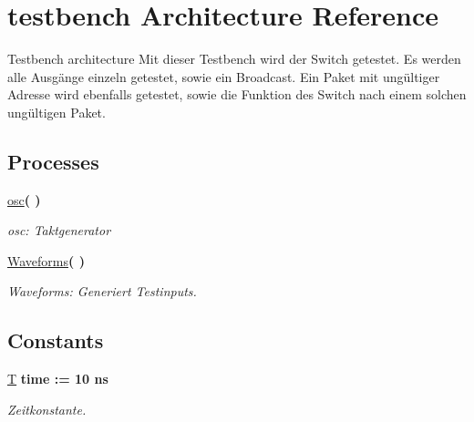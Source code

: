 \hypertarget{classtestbench_1_1testbench}{}\section{testbench Architecture Reference}
\label{classtestbench_1_1testbench}


Testbench architecture Mit dieser Testbench wird der Switch getestet. Es werden alle Ausgänge einzeln getestet, sowie ein Broadcast. Ein Paket mit ungültiger Adresse wird ebenfalls getestet, sowie die Funktion des Switch nach einem solchen ungültigen Paket.  


\subsection*{Processes}
 \begin{DoxyCompactItemize}
\item 
\mbox{\label{classtestbench_1_1testbench_a5e2335f6f6f0aa05413a0546a550ba71}} 
\mbox{\hyperlink{classtestbench_1_1testbench_a5e2335f6f6f0aa05413a0546a550ba71}{osc}}{\bfseries  (  )}
\begin{DoxyCompactList}\small\item\em osc\+: Taktgenerator \end{DoxyCompactList}\item 
\mbox{\label{classtestbench_1_1testbench_a77eeaf075b0fe111c4550ccc6850feb4}} 
\mbox{\hyperlink{classtestbench_1_1testbench_a77eeaf075b0fe111c4550ccc6850feb4}{Waveforms}}{\bfseries  (  )}
\begin{DoxyCompactList}\small\item\em Waveforms\+: Generiert Testinputs. \end{DoxyCompactList}\end{DoxyCompactItemize}
\subsection*{Constants}
 \begin{DoxyCompactItemize}
\item 
\mbox{\label{classtestbench_1_1testbench_a5bae344c2dded33b0445c1ff826c362b}} 
\mbox{\hyperlink{classtestbench_1_1testbench_a5bae344c2dded33b0445c1ff826c362b}{T}} {\bfseries \textcolor{comment}{time}\textcolor{vhdlchar}{ }\textcolor{vhdlchar}{ }\textcolor{vhdlchar}{\+:}\textcolor{vhdlchar}{=}\textcolor{vhdlchar}{ }\textcolor{vhdlchar}{ }\textcolor{vhdlchar}{ } \textcolor{vhdldigit}{10} \textcolor{vhdlchar}{ }\textcolor{vhdlchar}{ns}\textcolor{vhdlchar}{ }} 
\begin{DoxyCompactList}\small\item\em Zeitkonstante. \end{DoxyCompactList}\end{DoxyCompactItemize}
